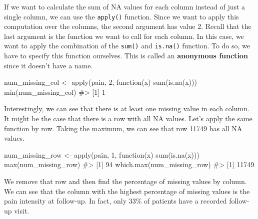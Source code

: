 \documentclass[
  letterpaper,
]{krantz}
\makeatletter
\newenvironment{Shaded}{\begin{snugshade}}{\end{snugshade}}
\newcommand{\CommentTok}[1]{\textcolor[rgb]{0.37,0.37,0.37}{#1}}
\newcommand{\ControlFlowTok}[1]{\textcolor[rgb]{0.00,0.23,0.31}{#1}}
\newcommand{\DecValTok}[1]{\textcolor[rgb]{0.68,0.00,0.00}{#1}}
\newcommand{\FunctionTok}[1]{\textcolor[rgb]{0.28,0.35,0.67}{#1}}
\newcommand{\NormalTok}[1]{\textcolor[rgb]{0.00,0.23,0.31}{#1}}
\newcommand{\OtherTok}[1]{\textcolor[rgb]{0.00,0.23,0.31}{#1}}
\newenvironment{kframe}{%
\medskip{}
\setlength{\fboxsep}{.8em}
 \def\at@end@of@kframe{}%
 \ifinner\ifhmode%
  \def\at@end@of@kframe{\end{minipage}}%
  \begin{minipage}{\columnwidth}%
 \fi\fi%
 \def\FrameCommand##1{\hskip\@totalleftmargin \hskip-\fboxsep
 \colorbox{shadecolor}{##1}\hskip-\fboxsep
     \hskip-\linewidth \hskip-\@totalleftmargin \hskip\columnwidth}%
 \MakeFramed {\advance\hsize-\width
   \@totalleftmargin\z@ \linewidth\hsize
   \@setminipage}}%
 {\par\unskip\endMakeFramed%
 \at@end@of@kframe}
\renewenvironment{Shaded}{\begin{kframe}}{\end{kframe}}
\makeatother
\begin{document}
If we want to calculate the sum of NA values for each column instead of
just a single column, we can use the \texttt{apply()} function. Since we
want to apply this computation over the columns, the second argument has
value 2. Recall that the last argument is the function we want to call
for each column. In this case, we want to apply the combination of the
\texttt{sum()} and \texttt{is.na()} function. To do so, we have to
specify this function ourselves. This is called an \textbf{anonymous
function} since it doesn't have a name.

\begin{Shaded}
\begin{Highlighting}[]
\NormalTok{num\_missing\_col }\OtherTok{\textless{}{-}} \FunctionTok{apply}\NormalTok{(pain, }\DecValTok{2}\NormalTok{, }\ControlFlowTok{function}\NormalTok{(x) }\FunctionTok{sum}\NormalTok{(}\FunctionTok{is.na}\NormalTok{(x)))}
\FunctionTok{min}\NormalTok{(num\_missing\_col)}
\CommentTok{\#\textgreater{} [1] 1}
\end{Highlighting}
\end{Shaded}

Interestingly, we can see that there is at least one missing value in
each column. It might be the case that there is a row with all NA
values. Let's apply the same function by row. Taking the maximum, we can
see that row 11749 has all NA values.

\begin{Shaded}
\begin{Highlighting}[]
\NormalTok{num\_missing\_row }\OtherTok{\textless{}{-}} \FunctionTok{apply}\NormalTok{(pain, }\DecValTok{1}\NormalTok{, }\ControlFlowTok{function}\NormalTok{(x) }\FunctionTok{sum}\NormalTok{(}\FunctionTok{is.na}\NormalTok{(x)))}
\FunctionTok{max}\NormalTok{(num\_missing\_row)}
\CommentTok{\#\textgreater{} [1] 94}
\FunctionTok{which.max}\NormalTok{(num\_missing\_row)}
\CommentTok{\#\textgreater{} [1] 11749}
\end{Highlighting}
\end{Shaded}

We remove that row and then find the percentage of missing values by
column. We can see that the column with the highest percentage of
missing values is the pain intensity at follow-up. In fact, only 33\% of
patients have a recorded follow-up visit.
\end{document}
